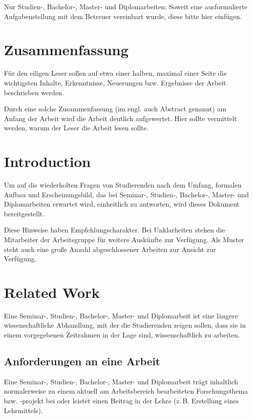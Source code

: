 \documentclass[
    fontsize=12pt,
    headings=small,
    parskip=half,           %
    bibliography=totoc,
    numbers=noenddot,       %
    open=any,               %
    ]{scrreprt}
\begin{document}
Nur Studien-, Bachelor-, Master- und Diplomarbeiten: Soweit eine ausformulierte Aufgabenstellung mit dem Betreuer vereinbart wurde, diese bitte hier einfügen.

\chapter*{Zusammenfassung}

Für den eiligen Leser sollen auf etwa einer halben, maximal einer Seite die wichtigsten Inhalte, Erkenntnisse, Neuerungen bzw. Ergebnisse der Arbeit beschrieben werden.

Durch eine solche Zusammenfassung (im engl. auch Abstract genannt) am Anfang der Arbeit wird die Arbeit deutlich aufgewertet. Hier sollte vermittelt werden, warum der Leser die Arbeit lesen sollte.

\tableofcontents

\chapter{Introduction}

Um auf die wiederholten Fragen von Studierenden nach dem Umfang, formalen Aufbau und Erscheinungsbild, das bei Seminar-, Studien-, Bachelor-, Master- und Diplomarbeiten erwartet wird, einheitlich zu antworten, wird dieses Dokument bereitgestellt.

Diese Hinweise haben Empfehlungscharakter. Bei Unklarheiten stehen die Mitarbeiter der Arbeitsgruppe für weitere Auskünfte zur Verfügung. Als Muster steht auch eine große Anzahl abgeschlossener Arbeiten zur Ansicht zur Verfügung.

\chapter{Related Work}

Eine Seminar-, Studien-, Bachelor-, Master- und Diplomarbeit ist eine längere wissenschaftliche Abhandlung, mit der die Studierenden zeigen sollen, dass sie in einem vorgegebenen Zeitrahmen in der Lage sind, wissenschaftlich zu arbeiten.

\section{Anforderungen an eine Arbeit}

Eine Seminar-, Studien-, Bachelor-, Master- und Diplomarbeit trägt inhaltlich normalerweise zu einem aktuell am Arbeitsbereich bearbeiteten Forschungsthema bzw. -projekt bei oder leistet einen Beitrag in der Lehre (z.\,B. Erstellung eines Lehrmittels).
\end{document}
